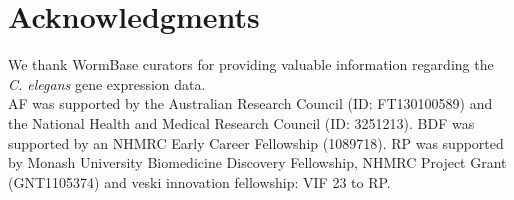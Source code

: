 \documentclass[10pt,letterpaper]{article}
\begin{document}
{%


\section*{Acknowledgments}
We thank WormBase curators for providing valuable information regarding the \emph{C. elegans} gene expression data. \\
AF was supported by the Australian Research Council (ID: FT130100589) and the National Health and Medical Research Council (ID: 3251213).
BDF was supported by an NHMRC Early Career Fellowship (1089718).
RP was supported by Monash University Biomedicine Discovery Fellowship, NHMRC Project Grant (GNT1105374) and veski innovation fellowship: VIF 23 to RP.

\nolinenumbers

%
%
%


}
\end{document}
